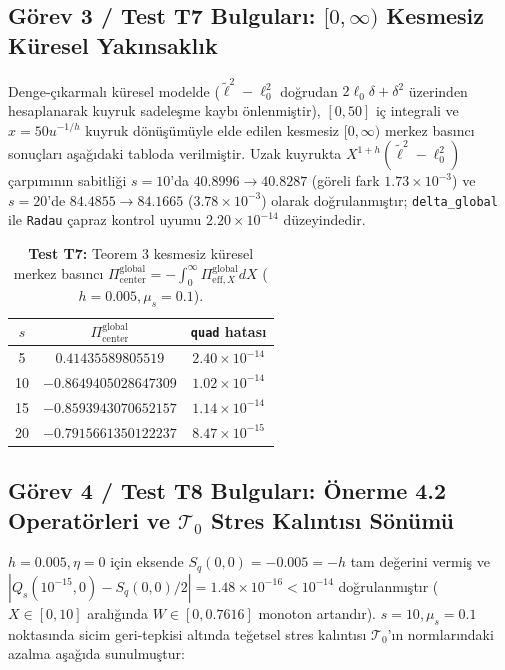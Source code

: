 \documentclass[12pt,a4paper]{article}
\begin{document}
\subsection{Görev 3 / Test T7 Bulguları: $[0,\infty)$ Kesmesiz Küresel Yakınsaklık}

Denge-çıkarmalı küresel modelde ($\tilde{\ell}^2 - \ell_0^2$ doğrudan $2\ell_0\delta + \delta^2$ üzerinden hesaplanarak kuyruk sadeleşme kaybı önlenmiştir), $[0, 50]$ iç integrali ve $x = 50 u^{-1/h}$ kuyruk dönüşümüyle elde edilen kesmesiz $[0, \infty)$ merkez basıncı sonuçları aşağıdaki tabloda verilmiştir. Uzak kuyrukta $X^{1+h}(\tilde{\ell}^2 - \ell_0^2)$ çarpımının sabitliği $s=10$'da $40.8996 \to 40.8287$ (göreli fark $1.73 \times 10^{-3}$) ve $s=20$'de $84.4855 \to 84.1665$ ($3.78 \times 10^{-3}$) olarak doğrulanmıştır; \texttt{delta\_global} ile \texttt{Radau} çapraz kontrol uyumu $2.20 \times 10^{-14}$ düzeyindedir.

\begin{table}[htbp]
\centering
\footnotesize
\caption{\textbf{Test T7:} Teorem 3 kesmesiz küresel merkez basıncı $\Pi_{\mathrm{center}}^{\mathrm{global}} = -\int_0^\infty \Pi_{\mathrm{eff},X}^{\mathrm{global}} dX$ ($h=0.005, \mu_s=0.1$).}
\vspace{0.1cm}
\begin{tabular}{c|c|c}
\hline
$s$ & $\Pi_{\mathrm{center}}^{\mathrm{global}}$ & \texttt{quad} hatası \\
\hline
5 & $0.41435589805519$ & $2.40\times 10^{-14}$ \\
10 & $-0.8649405028647309$ & $1.02\times 10^{-14}$ \\
15 & $-0.8593943070652157$ & $1.14\times 10^{-14}$ \\
20 & $-0.7915661350122237$ & $8.47\times 10^{-15}$ \\
\hline
\end{tabular}
\end{table}

\subsection{Görev 4 / Test T8 Bulguları: Önerme 4.2 Operatörleri ve $\mathcal{T}_0$ Stres Kalıntısı Sönümü}

$h=0.005, \eta=0$ için eksende $S_q(0,0) = -0.005 = -h$ tam değerini vermiş ve $|Q_s(10^{-15}, 0) - S_q(0,0)/2| = 1.48 \times 10^{-16} < 10^{-14}$ doğrulanmıştır ($X \in [0,10]$ aralığında $W \in [0, 0.7616]$ monoton artandır). $s=10, \mu_s=0.1$ noktasında sicim geri-tepkisi altında teğetsel stres kalıntısı $\mathcal{T}_0$'ın normlarındaki azalma aşağıda sunulmuştur:
\end{document}
